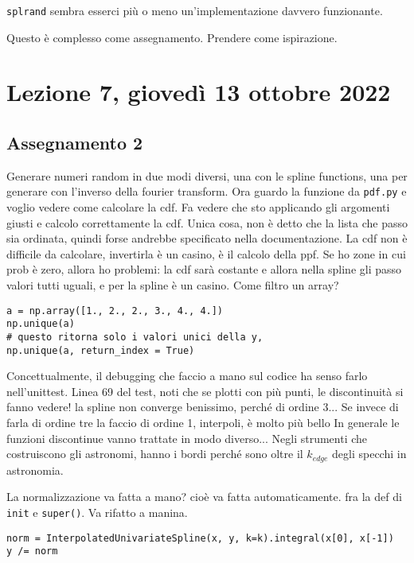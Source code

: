\documentclass[10pt, a4paper, titlepage]{book}
\begin{document}
\texttt{splrand} sembra esserci più o meno un'implementazione davvero funzionante.

Questo è complesso come assegnamento. Prendere come ispirazione.

\section{Lezione 7, giovedì 13 ottobre 2022}

\subsection{Assegnamento 2}

Generare numeri random in due modi diversi, una con le spline functions, una per generare con l'inverso della fourier transform.
Ora guardo la funzione da \texttt{pdf.py} e voglio vedere come calcolare la cdf. Fa vedere che sto applicando gli argomenti giusti e calcolo correttamente la cdf. 
Unica cosa, non è detto che la lista che passo sia ordinata, quindi forse andrebbe specificato nella documentazione.
La cdf non è difficile da calcolare, invertirla è un casino, è il calcolo della ppf.
Se ho zone in cui prob è zero, allora ho problemi: la cdf sarà costante e allora nella spline gli passo valori tutti uguali, e per la spline è un casino.
Come filtro un array?

\begin{verbatim}
a = np.array([1., 2., 2., 3., 4., 4.])
np.unique(a)
# questo ritorna solo i valori unici della y, 
np.unique(a, return_index = True)
\end{verbatim}

Concettualmente, il debugging che faccio a mano sul codice ha senso farlo nell'unittest.
Linea 69 del test, noti che se plotti con più punti, le discontinuità si fanno vedere! la spline non converge benissimo, perché di ordine 3...
Se invece di farla di ordine tre la faccio di ordine 1, interpoli, è molto più bello
In generale le funzioni discontinue vanno trattate in modo diverso... 
Negli strumenti che costruiscono gli astronomi, hanno i bordi perché sono oltre il $k_{edge}$ degli specchi in astronomia.

La normalizzazione va fatta a mano? cioè va fatta automaticamente.
fra la def di \texttt{init} e \texttt{super()}. Va rifatto a manina.

\begin{verbatim}
norm = InterpolatedUnivariateSpline(x, y, k=k).integral(x[0], x[-1])
y /= norm
\end{verbatim}
\end{document}
